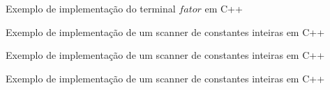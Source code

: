\begin{frame}[fragile]{Exemplo de implementação do terminal $fator$ em C++}
\end{frame}

\begin{frame}[fragile]{Exemplo de implementação de um scanner de constantes inteiras em C++}
\end{frame}

\begin{frame}[fragile]{Exemplo de implementação de um scanner de constantes inteiras em C++}
\end{frame}

\begin{frame}[fragile]{Exemplo de implementação de um scanner de constantes inteiras em C++}
\end{frame}
